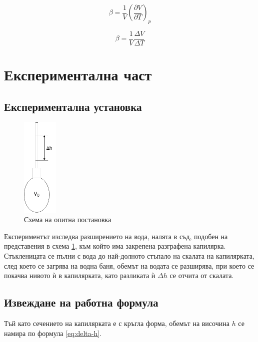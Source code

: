 \documentclass[12pt]{article}
\begin{document}
\begin{equation}\label{eq:coefficient-of-thermal-expansion}
    \beta = \frac{1}{V}\left(\frac{\partial V}{\partial T}\right)_p
\end{equation}
 
\begin{equation}\label{eq:2-coefficient-of-thermal-expansion}
    \beta = \frac{1}{V}\frac{\Delta V}{\Delta T}
\end{equation}

\section{Експериментална част}

\subsection{Експериментална установка}
\begin{figure}
    \centering
    \includegraphics[width=0.15\textwidth]{images/set-up-thermal-expansion.drawio.png}
    \caption{\label{fig:setup}Схема на опитна постановка}
    \label{fig:setup}
\end{figure}

Експериментът изследва разширението на вода, налята в съд, подобен на представения в схема \ref{fig:setup}, към който има закрепена разграфена капилярка. Стъкленицата се пълни с вода до най-долното стъпало на скалата на капилярката, след което се загрява на водна баня, обемът на водата се разширява, при което се покачва нивото ѝ в капилярката, като разликата ѝ $\Delta h$ се отчита от скалата.

\subsection{Извеждане на работна формула}
Тъй като сечението на капилярката е с кръгла форма, обемът на височина $h$ се намира по формула \ref{eq:delta-h}.
\end{document}
